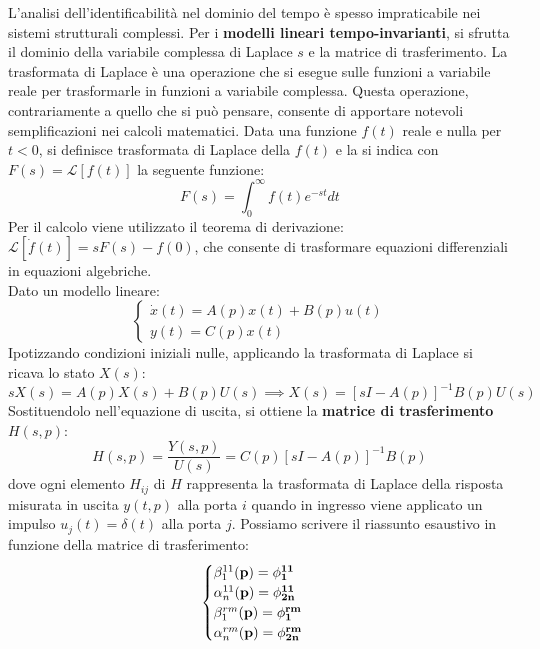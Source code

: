 L'analisi dell'identificabilità nel dominio del tempo è spesso impraticabile nei sistemi strutturali complessi. Per i \textbf{modelli lineari tempo-invarianti}, si sfrutta il dominio della variabile complessa di Laplace $s$ e la matrice di trasferimento. La trasformata di Laplace è una operazione che si esegue sulle funzioni a variabile reale per trasformarle in funzioni a variabile complessa. Questa operazione, contrariamente a quello che si può pensare, consente di apportare notevoli semplificazioni nei calcoli matematici. Data una funzione $f(t)$ reale e nulla per $t < 0$, si definisce trasformata di Laplace della $f(t)$ e la si indica con $F(s) = \mathcal{L}[f(t)]$ la seguente funzione:
\begin{equation}
F(s) = \int_0^{\infty} f(t)e^{-st} dt
\end{equation}
Per il calcolo viene utilizzato il teorema di derivazione: $\mathcal{L}[\dot{f}(t)] = sF(s) - f(0)$, che consente di trasformare equazioni differenziali in equazioni algebriche.\\
Dato un modello lineare:
\begin{equation}
\begin{cases}
\dot{x}(t) = A(p)x(t) + B(p)u(t) \\
y(t) = C(p)x(t)
\end{cases}
\end{equation}
Ipotizzando condizioni iniziali nulle, applicando la trasformata di Laplace si ricava lo stato $X(s)$:
\begin{equation}
sX(s) = A(p)X(s) + B(p)U(s) \implies X(s) = [sI - A(p)]^{-1}B(p)U(s)
\end{equation}
Sostituendolo nell'equazione di uscita, si ottiene la \textbf{matrice di trasferimento} $H(s,p)$:
\begin{equation}
H(s, p) = \frac{Y(s, p)}{U(s)} = C(p)[sI - A(p)]^{-1}B(p)
\end{equation}
dove ogni elemento $H_{ij}$ di $H$ rappresenta la trasformata di Laplace della risposta misurata in uscita $y(t, p)$ alla porta $i$ quando in ingresso viene applicato un impulso $u_j(t) = \delta(t)$ alla porta $j$. Possiamo scrivere il riassunto esaustivo in funzione della matrice di trasferimento:
\begin{equation}
\begin{cases}
    \beta_1^{11}(\bf{p}) =\phi_1^{11} \\
    \alpha_n^{11}(\bf{p}) =\phi_{2n}^{11} \\
    \beta_1^{rm}(\bf{p}) = \phi_1^{rm} \\
    \alpha_n^{rm}(\bf{p}) = \phi_{2n}^{rm}
\end{cases} 
\end{equation}
